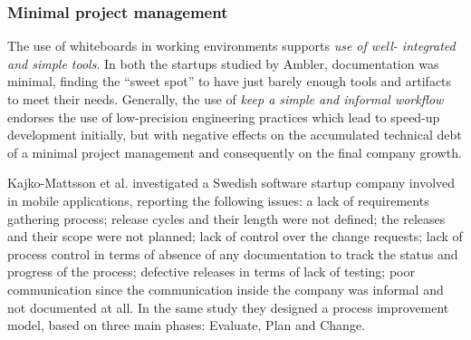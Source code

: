 \documentclass[10pt,journal,letterpaper,compsoc]{IEEEtran}
\begin{document}
\subsubsection{Minimal project management}

The use of whiteboards in working environments supports \textit{use of  well-
integrated and simple tools}. In both the startups studied by Ambler,
documentation was minimal, finding the ``sweet spot'' to have just barely enough
tools and artifacts to meet their needs. Generally, the use of \textit{keep a
simple and informal workflow} endorses the use of low-precision engineering
practices which lead to speed-up development initially, but with negative
effects on the accumulated technical debt of a minimal project management and
consequently on the final company growth.

Kajko-Mattsson et al. \cite{Kajko-Mattsson2008} investigated a Swedish software
startup company involved in mobile applications, reporting the following issues:
a lack of requirements gathering process; release cycles and their length were
not defined; the releases and their scope were not planned; lack of control over
the change requests; lack of process control in terms of  absence of any
documentation to track the status and progress of the process; defective
releases in terms of lack of testing; poor communication since the communication
inside the company was informal and not documented at all. In the same study
they designed a process improvement model, based on three main phases: Evaluate,
Plan and Change.
\end{document}

